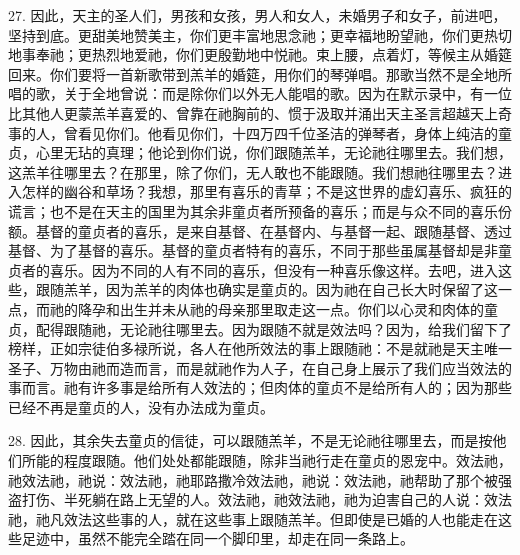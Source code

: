 27. 因此，天主的圣人们，男孩和女孩，男人和女人，未婚男子和女子，前进吧，坚持到底。更甜美地赞美主，你们更丰富地思念祂；更幸福地盼望祂，你们更热切地事奉祂；更热烈地爱祂，你们更殷勤地中悦祂。束上腰，点着灯，等候主从婚筵回来。你们要将一首新歌带到羔羊的婚筵，用你们的琴弹唱。那歌当然不是全地所唱的歌，关于全地曾说：而是除你们以外无人能唱的歌。因为在默示录中，有一位比其他人更蒙羔羊喜爱的、曾靠在祂胸前的、惯于汲取并涌出天主圣言超越天上奇事的人，曾看见你们。他看见你们，十四万四千位圣洁的弹琴者，身体上纯洁的童贞，心里无玷的真理；他论到你们说，你们跟随羔羊，无论祂往哪里去。我们想，这羔羊往哪里去？在那里，除了你们，无人敢也不能跟随。我们想祂往哪里去？进入怎样的幽谷和草场？我想，那里有喜乐的青草；不是这世界的虚幻喜乐、疯狂的谎言；也不是在天主的国里为其余非童贞者所预备的喜乐；而是与众不同的喜乐份额。基督的童贞者的喜乐，是来自基督、在基督内、与基督一起、跟随基督、透过基督、为了基督的喜乐。基督的童贞者特有的喜乐，不同于那些虽属基督却是非童贞者的喜乐。因为不同的人有不同的喜乐，但没有一种喜乐像这样。去吧，进入这些，跟随羔羊，因为羔羊的肉体也确实是童贞的。因为祂在自己长大时保留了这一点，而祂的降孕和出生并未从祂的母亲那里取走这一点。你们以心灵和肉体的童贞，配得跟随祂，无论祂往哪里去。因为跟随不就是效法吗？因为，给我们留下了榜样，正如宗徒伯多禄所说，各人在他所效法的事上跟随祂：不是就祂是天主唯一圣子、万物由祂而造而言，而是就祂作为人子，在自己身上展示了我们应当效法的事而言。祂有许多事是给所有人效法的；但肉体的童贞不是给所有人的；因为那些已经不再是童贞的人，没有办法成为童贞。\par

28. 因此，其余失去童贞的信徒，可以跟随羔羊，不是无论祂往哪里去，而是按他们所能的程度跟随。他们处处都能跟随，除非当祂行走在童贞的恩宠中。效法祂，祂效法祂，祂说：效法祂，祂耶路撒冷效法祂，祂说：效法祂，祂帮助了那个被强盗打伤、半死躺在路上无望的人。效法祂，祂效法祂，祂为迫害自己的人说：效法祂，祂凡效法这些事的人，就在这些事上跟随羔羊。但即使是已婚的人也能走在这些足迹中，虽然不能完全踏在同一个脚印里，却走在同一条路上。\par


